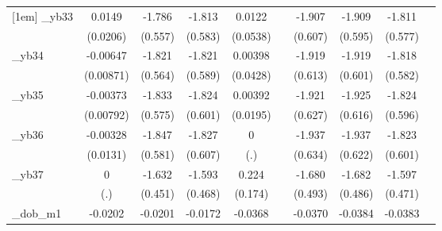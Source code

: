 \begin{table}[htbp]
\begin{tabular}{l*{9}{c}}
[1em]
\_yb33       &      0.0149         &      -1.786\sym{***}&      -1.813\sym{***}&      0.0122         &                     &      -1.907\sym{***}&      -1.909\sym{***}&      -1.811\sym{***}&                     \\
            &    (0.0206)         &     (0.557)         &     (0.583)         &    (0.0538)         &                     &     (0.607)         &     (0.595)         &     (0.577)         &                     \\
[1em]
\_yb34       &    -0.00647         &      -1.821\sym{***}&      -1.821\sym{***}&     0.00398         &                     &      -1.919\sym{***}&      -1.919\sym{***}&      -1.818\sym{***}&                     \\
            &   (0.00871)         &     (0.564)         &     (0.589)         &    (0.0428)         &                     &     (0.613)         &     (0.601)         &     (0.582)         &                     \\
[1em]
\_yb35       &    -0.00373         &      -1.833\sym{***}&      -1.824\sym{***}&     0.00392         &                     &      -1.921\sym{***}&      -1.925\sym{***}&      -1.824\sym{***}&                     \\
            &   (0.00792)         &     (0.575)         &     (0.601)         &    (0.0195)         &                     &     (0.627)         &     (0.616)         &     (0.596)         &                     \\
[1em]
\_yb36       &    -0.00328         &      -1.847\sym{***}&      -1.827\sym{***}&           0         &                     &      -1.937\sym{***}&      -1.937\sym{***}&      -1.823\sym{***}&                     \\
            &    (0.0131)         &     (0.581)         &     (0.607)         &         (.)         &                     &     (0.634)         &     (0.622)         &     (0.601)         &                     \\
[1em]
\_yb37       &           0         &      -1.632\sym{***}&      -1.593\sym{***}&       0.224         &                     &      -1.680\sym{***}&      -1.682\sym{***}&      -1.597\sym{***}&                     \\
            &         (.)         &     (0.451)         &     (0.468)         &     (0.174)         &                     &     (0.493)         &     (0.486)         &     (0.471)         &                     \\
[1em]
\_dob\_m1     &     -0.0202         &     -0.0201         &     -0.0172         &     -0.0368\sym{*}  &                     &     -0.0370\sym{*}  &     -0.0384\sym{*}  &     -0.0383\sym{**} &                     \\

\end{tabular}
\end{table}
